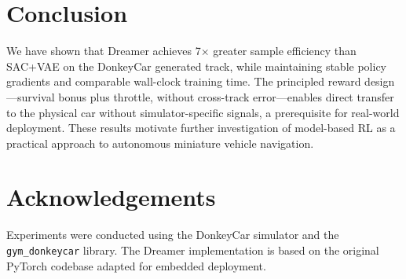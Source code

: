 \documentclass[10pt,twocolumn]{article}
\begin{document}
\section{Conclusion}

We have shown that Dreamer achieves 7$\times$ greater sample efficiency
than SAC+VAE on the DonkeyCar generated track, while maintaining stable
policy gradients and comparable wall-clock training time.
The principled reward design—survival bonus plus throttle, without
cross-track error—enables direct transfer to the physical car without
simulator-specific signals, a prerequisite for real-world deployment.
These results motivate further investigation of model-based RL as a
practical approach to autonomous miniature vehicle navigation.

\section*{Acknowledgements}
Experiments were conducted using the DonkeyCar simulator and the
\texttt{gym\_donkeycar} library. The Dreamer implementation is based on
the original PyTorch codebase adapted for embedded deployment.



\end{document}
